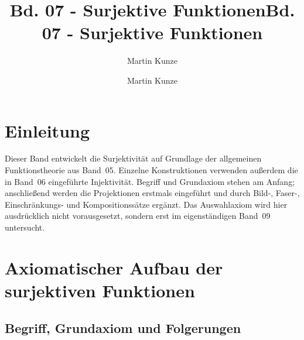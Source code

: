 \documentclass[main.tex]{subfiles}
\title{Bd. 07 - Surjektive Funktionen}
\author{Martin Kunze}
\date{}
\begin{document}
\title{Bd. 07 - Surjektive Funktionen}
\author{Martin Kunze}
\date{}
\hypersetup{pageanchor=false}
\maketitle
\hypersetup{pageanchor=true}
\setcounter{tocdepth}{3}
\tableofcontents
\setcounter{file}{7}
\renewcommand{\FormulaBandID}{7}

\chapter{Einleitung}

Dieser Band entwickelt die Surjektivität auf Grundlage der allgemeinen
Funktionstheorie aus Band~05. Einzelne Konstruktionen verwenden außerdem die
in Band~06 eingeführte Injektivität. Begriff und Grundaxiom stehen am Anfang;
anschließend werden die Projektionen erstmals eingeführt und durch Bild-,
Faser-, Einschränkungs- und Kompositionssätze ergänzt.
Das Auswahlaxiom wird hier ausdrücklich nicht vorausgesetzt, sondern erst im
eigenständigen Band~09 untersucht.

\chapter{Axiomatischer Aufbau der surjektiven Funktionen}

\section{Begriff, Grundaxiom und Folgerungen}


{
}

\begin{tabproof}
\end{tabproof}
\end{document}
